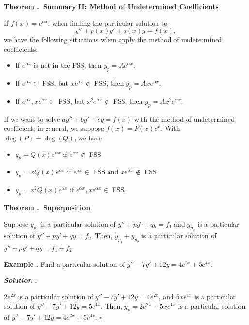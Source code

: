 \documentclass[12pt, a4paper]{article}
\newcounter{index}[subsection]
\newenvironment*{eg}{\begin{framed}\par\noindent\textbf{Example \thesubsection.\stepcounter{index}\theindex}}{\par\end{framed}}
\newenvironment*{thm}[1]{\begin{tcolorbox}\par\noindent\textbf{Theorem \thesubsection.\stepcounter{index}\theindex\ #1} \par}{\par\end{tcolorbox}}
\newcounter{nprf}[subsection]
\newenvironment*{sol}{\par\indent\textbf{\textit{Solution \stepcounter{nprf}\thenprf.}}\par}{\hfill{$\square$}\par}
\begin{document}
\begin{thm}{Summary II: Method of Undetermined Coefficients}
	If $f(x)=e^{\alpha x}$, when finding the particular solution to \[y''+p(x)y'+q(x)y=f(x),\] we have the following situations when apply the method of undetermined coefficients: 
	\begin{itemize}
		\item If $e^{\alpha x}$ is not in the FSS, then $y_p=Ae^{\alpha x}$.
		\item If $e^{\alpha x}\in$ FSS, but $xe^{\alpha x}\notin$ FSS, then $y_p=Axe^{\alpha x}$.
		\item If $e^{\alpha x},xe^{\alpha x}\in$ FSS, but $x^2e^{\alpha x}\notin$ FSS, then $y_p=Ax^2e^{\alpha x}$.
	\end{itemize}
	If we want to solve $ay''+by'+cy=f(x)$ with the method of undetermined coefficient, in general, we suppose $f(x)=P(x)e^x$. With $\deg(P)=\deg(Q)$, we have 
	\begin{itemize}
		\item $y_p=Q(x)e^{\alpha x}$ if $e^{\alpha x}\notin$ FSS
		\item $y_p=xQ(x)e^{\alpha x}$ if $e^{\alpha x}\in$ FSS and $xe^{\alpha x}\notin$ FSS.
		\item $y_p=x^2Q(x)e^{\alpha x}$ if $e^{\alpha x}, xe^{\alpha x}\in$ FSS. 
	\end{itemize}
\end{thm}
\begin{thm}{Superposition}
	Suppose $y_{p_1}$ is a particular solution of $y''+py'+qy=f_1$ and $y_{p_2}$ is a particular solution of $y''+py'+qy=f_2$. Then, $y_{p_1}+y_{p_2}$ is a particular solution of $y''+py'+qy=f_1+f_2$.
\end{thm}
\begin{eg}
	Find a particular solution of $y''-7y'+12y=4e^{2x}+5e^{4x}$. 
	\begin{sol}	
		$2e^{2x}$ is a particular solution of $y''-7y'+12y=4e^{2x}$, and $5xe^{4x}$ is a particular solution of $y''-7y'+12y=5e^{4x}$. Then, $y_p=2e^{2x}+5xe^{4x}$ is a particular solution of $y''-7y'+12y=4e^{2x}+5e^{4x}$. 
	\end{sol}
\end{eg}
\end{document}
